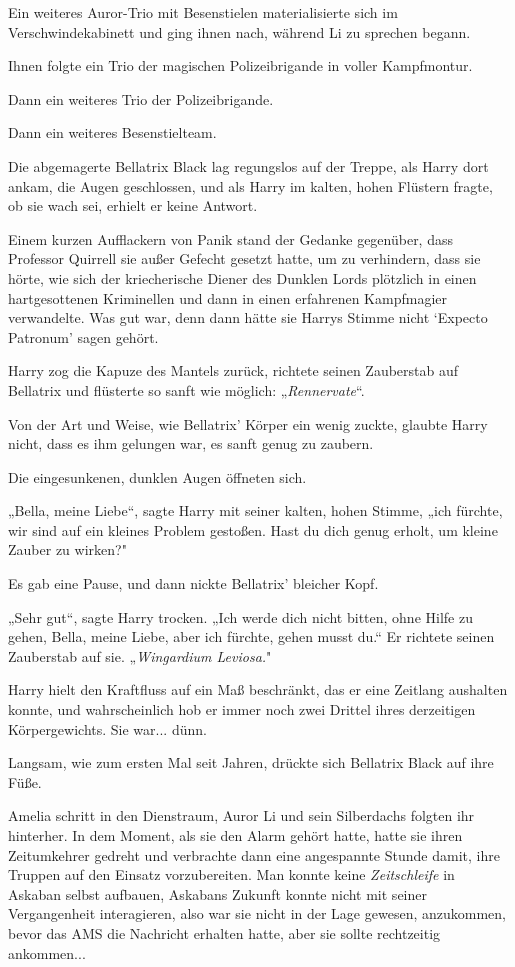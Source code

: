 {Ein weiteres Auror-Trio mit Besenstielen materialisierte sich im Verschwindekabinett und ging ihnen nach, während Li zu sprechen begann.

Ihnen folgte ein Trio der magischen Polizeibrigande in voller Kampfmontur.

Dann ein weiteres Trio der Polizeibrigande.

Dann ein weiteres Besenstielteam.

Die abgemagerte Bellatrix Black lag regungslos auf der Treppe, als Harry dort ankam, die Augen geschlossen, und als Harry im kalten, hohen Flüstern fragte, ob sie wach sei, erhielt er keine Antwort.

Einem kurzen Aufflackern von Panik stand der Gedanke gegenüber, dass Professor Quirrell sie außer Gefecht gesetzt hatte, um zu verhindern, dass sie hörte, wie sich der kriecherische Diener des Dunklen Lords plötzlich in einen hartgesottenen Kriminellen und dann in einen erfahrenen Kampfmagier verwandelte. Was gut war, denn dann hätte sie Harrys Stimme nicht `Expecto Patronum' sagen gehört.

Harry zog die Kapuze des Mantels zurück, richtete seinen Zauberstab auf Bellatrix und flüsterte so sanft wie möglich: „\emph{Rennervate}“.

Von der Art und Weise, wie Bellatrix' Körper ein wenig zuckte, glaubte Harry nicht, dass es ihm gelungen war, es sanft genug zu zaubern.

Die eingesunkenen, dunklen Augen öffneten sich.

„Bella, meine Liebe“, sagte Harry mit seiner kalten, hohen Stimme, „ich fürchte, wir sind auf ein kleines Problem gestoßen. Hast du dich genug erholt, um kleine Zauber zu wirken?"

Es gab eine Pause, und dann nickte Bellatrix' bleicher Kopf.

„Sehr gut“, sagte Harry trocken. „Ich werde dich nicht bitten, ohne Hilfe zu gehen, Bella, meine Liebe, aber ich fürchte, gehen musst du.“ Er richtete seinen Zauberstab auf sie. „\emph{Wingardium Leviosa.}"

Harry hielt den Kraftfluss auf ein Maß beschränkt, das er eine Zeitlang aushalten konnte, und wahrscheinlich hob er immer noch zwei Drittel ihres derzeitigen Körpergewichts. Sie war... dünn.

Langsam, wie zum ersten Mal seit Jahren, drückte sich Bellatrix Black auf ihre Füße.

Amelia schritt in den Dienstraum, Auror Li und sein Silberdachs folgten ihr hinterher. In dem Moment, als sie den Alarm gehört hatte, hatte sie ihren Zeitumkehrer gedreht und verbrachte dann eine angespannte Stunde damit, ihre Truppen auf den Einsatz vorzubereiten. Man konnte keine \emph{Zeitschleife} in Askaban selbst aufbauen, Askabans Zukunft konnte nicht mit seiner Vergangenheit interagieren, also war sie nicht in der Lage gewesen, anzukommen, bevor das AMS die Nachricht erhalten hatte, aber sie sollte rechtzeitig ankommen...

}
